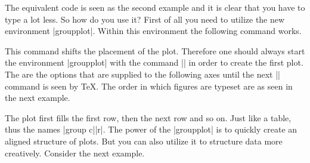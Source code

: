 {The equivalent code is seen as the second example and it is clear that you have to type a lot less. So how do you use it?
First of all you need to utilize the new environment |groupplot|. Within this environment the following command works.
\begin{command}{\nextgroupplot{} }
\label{cmd:pgfplots:nextgroupplot}
This command shifts the placement of the plot. Therefore one should always start the environment |groupplot| with the command
|\nextgroupplot| in order to create the first plot. The  are the options that are supplied to the following axes until
the next |\nextgroupplot| command is seen by \TeX.
The order in which figures are typeset are as seen in the next example.
\begin{codeexample}[]
\end{codeexample}
The plot first fills the first row, then the next row and so on. Just like a table, thus the names |group c||r|. The power of the |groupplot| is
to quickly create an aligned structure of plots. But you can also utilize it to structure data more creatively. Consider the next example.
\begin{codeexample}[]
\end{codeexample}


\end{command}}
